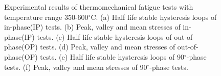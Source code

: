 \begin{figure}
  \caption{Experimental results of thermomechanical fatigue tests with temperature range 350-600$^{\circ}$C.
  (a) Half life stable hysteresis loops of in-phase(IP) tests.
  (b) Peak, valley and mean stresses of in-phase(IP) tests.
  (c) Half life stable hysteresis loops of out-of-phase(OP) tests.
  (d) Peak, valley and mean stresses of out-of-phase(OP) tests.
  (e) Half life stable hysteresis loops of 90$^{\circ}$-phase tests.
  (f) Peak, valley and mean stresses of 90$^{\circ}$-phase tests.}
  \label{Fig:plot_exp_TCTMF}
\end{figure}

%

